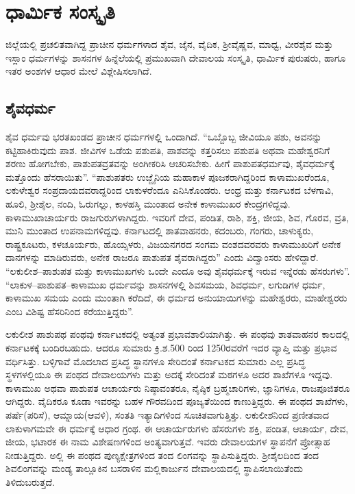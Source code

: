 
\chapter{ಧಾರ್ಮಿಕ ಸಂಸ್ಕೃತಿ}

ಜಿಲ್ಲೆಯಲ್ಲಿ ಪ್ರಚಲಿತವಾಗಿದ್ದ ಪ್ರಾಚೀನ ಧರ್ಮಗಳಾದ ಶೈವ, ಜೈನ, ವೈದಿಕ, ಶ‍್ರೀವೈಷ್ಣವ, ಮಾಧ್ವ, ವೀರಶೈವ ಮತ್ತು ಇಸ್ಲಾಂ ಧರ್ಮಗಳನ್ನು ಶಾಸನಗಳ ಹಿನ್ನೆಲೆಯಲ್ಲಿ ಪ್ರಮುಖವಾಗಿ ದೇವಾಲಯ ಸಂಸ್ಕೃತಿ, ಧಾರ್ಮಿಕ ಪುರುಷರು, ಹಾಗೂ ಇತರ ಅಂಶಗಳ ಆಧಾರ ಮೇಲೆ ವಿಶ್ಲೇಷಿಸಲಾಗಿದೆ.

\section{ಶೈವಧರ್ಮ}

 ಶೈವ ಧರ್ಮವು ಭರತಖಂಡದ ಪ್ರಾಚೀನ ಧರ್ಮಗಳಲ್ಲಿ ಒಂದಾಗಿದೆ. “ಒಬ್ಬೊಬ್ಬ ಜೀವಿಯೂ ಪಶು, ಅವನನ್ನು ಕಟ್ಟಿಹಾಕಿರುವುದು ಪಾಶ. ಜೀವಿಗಳ ಒಡೆಯ ಪಶುಪತಿ, ಪಾಶವನ್ನು ಕತ್ತರಿಸಲು ಪಶುಪತಿ ಅಥವಾ ಮಹೇಶ್ವರನಿಗೆ ಶರಣು ಹೋಗಬೇಕು, ಪಾಶುಪತವ್ರತವನ್ನು ಅಂಗೀಕರಿಸಿ ಆಚರಿಸಬೇಕು. ಹೀಗೆ ಪಾಶುಪತಧರ್ಮವು, ಶೈವಧರ್ಮಕ್ಕೆ ಮತ್ತೊಂದು ಹೆಸರಾಯಿತು”. “ಪಾಶುಪತರು ಉಜ್ಜೈನಿಯ ಮಹಾಕಾಳ ಪೂಜಕರಾಗಿದ್ದರಿಂದ ಕಾಳಾಮುಖರೆಂದೂ, ಲಕುಳೇಶ್ವರ ಸಂಪ್ರದಾಯದವರಾದ್ದರಿಂದ ಲಾಕುಳರೆಂದೂ ಎನಿಸಿಕೊಂಡರು. ಆಂಧ್ರ ಮತ್ತು ಕರ್ನಾಟಕದ ಬೆಳಗಾವಿ, ಹೂಲಿ, ಶ‍್ರೀಶೈಲ, ನಂದಿ, ಓರುಗಲ್ಲು, ಕಾಳಹಸ್ತಿ ಮುಂತಾದ ಅನೇಕ ಕಾಳಾಮುಖರ ಕೇಂದ್ರಗಳಿದ್ದವು. ಕಾಳಾಮುಖಾಚಾರ್ಯರು ರಾಜಗುರುಗಳಾಗಿದ್ದರು. ಇವರಿಗೆ ದೇವ, ಪಂಡಿತ, ರಾಶಿ, ಶಕ್ತಿ, ಜೀಯ, ಶಿವ, ಗೊರವ, ವ್ರತಿ, ಮುನಿ ಮುಂತಾದ ಉಪನಾಮಗಳಿದ್ದವು. ಕರ್ನಾಟದಲ್ಲಿ ಶಾತವಾಹನರು, ಕದಂಬರು, ಗಂಗರು, ಚಾಳುಕ್ಯರು, ರಾಷ್ಟ್ರಕೂಟರು, ಕಳಚೂರ್ಯರು, ಹೊಯ್ಸಳರು, ವಿಜಯನಗರದ ಸಂಗಮ ವಂಶದವರವರು ಕಾಳಾಮುಖರಿಗೆ ಅನೇಕ ದಾನಗಳನ್ನು ಮಾಡಿರುವರು, ಅನೇಕ ರಾಜರೂ ಪಾಶುಪತ ಶೈವರಾಗಿದ್ದರು” ಎಂದು ವಿದ್ವಾಂಸರು ಹೇಳಿದ್ದಾರೆ. “ಲಕುಲೀಶ–ಪಾಶುಪತ ಮತ್ತು ಕಾಳಾಮುಖಗಳು ಒಂದೇ ಎಂದೂ ಅವು ಶೈವಧರ್ಮಕ್ಕೆ ಇರುವ ಇನ್ನೆರಡು ಹೆಸರುಗಳು”. “ಲಾಕುಳ–ಪಾಶುಪತ–ಕಾಳಾಮುಖ ಧರ್ಮವನ್ನು ಶಾಸನಗಳಲ್ಲಿ ಶಿವಸಮಯ, ಶಿವಧರ್ಮ, ಲಗುಡಿಗಳ ಧರ್ಮ, ಕಾಳಾಮುಖ ಸಮಯ ಎಂದು ಮುಂತಾಗಿ ಕರೆದಿದೆ, ಈ ಧರ್ಮದ ಅನುಯಾಯಿಗಳನ್ನು ಮಹೇಶ್ವರರು, ಮಾಹೇಶ್ವರರು ಎಂಬ ವಿಶಿಷ್ಟ ಹೆಸರಿನಿಂದ ಕರೆಯುತ್ತಿದ್ದರು”.

ಲಕುಲೀಶ ಪಾಶುಪಥ ಪಂಥವು ಕರ್ನಾಟಕದಲ್ಲಿ ಅತ್ಯಂತ ಪ್ರಭಾವಶಾಲಿಯಾಗಿತ್ತು. ಈ ಪಂಥವು ಶಾತವಾಹನರ ಕಾಲದಲ್ಲಿ ಕರ್ನಾಟಕಕ್ಕೆ ಬಂದಿರಬಹುದು. ಆದರೂ ಸುಮಾರು ಕ್ರಿ.ಶ.500 ರಿಂದ 1250ರವರೆಗೆ ಇದರ ವ್ಯಾಪ್ತಿ ಮತ್ತು ಪ್ರಭಾವ ವರ್ಧಿಸಿತ್ತು. ಬಳ್ಳಿಗಾವೆ ಮೊದಲಾದ ಪ್ರಸಿದ್ಧ ಸ್ಥಾನಗಳೂ ಸೇರಿದಂತೆ ಕರ್ನಾಟಕದ ಸುಮಾರು ಎಲ್ಲ ಪ್ರಸಿದ್ಧ ಸ್ಥಳಗಳಲ್ಲಿಯೂ ಈ ಪಂಥದ ದೇವಾಲಯಗಳು ಮತ್ತು ಅದಕ್ಕೆ ಸೇರಿದಂತೆ ಮಠಗಳೂ ಅದರ ಶಾಖೆಗಳೂ ಇದ್ದವು. ಕಾಳಾಮುಖ ಅಥವಾ ಪಾಶುಪತ ಆಚಾರ್ಯರು ನಿಷ್ಠಾವಂತರೂ, ನೈಷ್ಠಿಕ ಬ್ರಹ್ಮಚಾರಿಗಳು, ಜ್ಞಾನಿಗಳೂ, ರಾಜಪೂಜಿತರೂ ಆಗಿದ್ದರು. ವೈದಿಕರೂ ಕೂಡಾ ಇವರನ್ನು ಬಹಳ ಗೌರವದಿಂದ ಪೂಜ್ಯತೆಯಿಂದ ಕಾಣುತ್ತಿದ್ದರು. ಈ ಪಂಥದ ಶಾಖೆಗಳು, ಪರ್ಷೆ(ಪರಿಸೆ), ಆಮ್ನಾಯ(ಆವಳಿ), ಸಂತತಿ ಇತ್ಯಾದಿಗಳಿಂದ ಸೂಚಿತವಾಗುತ್ತಿತ್ತು. ಲಕುಲೀಶನಿಂದ ಪ್ರಣೀತವಾದ ಲಾಕುಳಾಗಮವೇ ಈ ಧರ್ಮಕ್ಕೆ ಆಧಾರ ಗ್ರಂಥ. ಈ ಆಚಾರ್ಯರುಗಳು ಹೆಸರುಗಳು ಶಕ್ತಿ, ಪಂಡಿತ, ಆಚಾರ್ಯ, ದೇವ, ಜೀಯ, ಭಟಾರಕ ಈ ನಾಮ ವಿಶೇಷಣಗಳಿಂದ ಅಂತ್ಯವಾಗುತ್ತವೆ. ಇವರು ದೇವಾಲಯಗಳ ಸ್ಥಾಪನೆಗೆ ಪ್ರೋತ್ಸಾಹ ನೀಡುತ್ತಿದ್ದರು. ಅಲ್ಲಿ ಈ ಪಂಥದ ಪುಣ್ಯಕ್ಷೇತ್ರಗಳಿಂದ ತಂದ ಲಿಂಗವನ್ನು ಸ್ಥಾಪಿಸುತ್ತಿದ್ದರು. ಶ‍್ರೀಶೈಲದಿಂದ ತಂದ ಶಿವಲಿಂಗವನ್ನು ಮಂಡ್ಯ ತಾಲ್ಲೂಕಿನ ಬಸರಾಳಿನ ಮಲ್ಲಿಕಾರ್ಜುನ ದೇವಾಲಯದಲ್ಲಿ ಸ್ಥಾಪಿಸಲಾಯಿತೆಂದು ತಿಳಿದುಬರುತ್ತದೆ.

